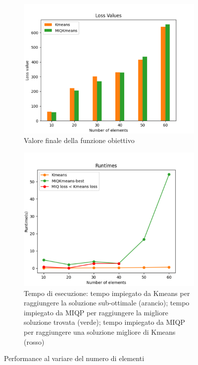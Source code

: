 \documentclass{article}
\begin{document}
    \begin{figure}[H]
     \centering
     \begin{subfigure}[t]{0.49\linewidth}
         \centering
         \includegraphics[width=\linewidth]{../results/plots/loss_size_heart}
         \caption{Valore finale della funzione obiettivo}
     \end{subfigure}
     \hfill
     \begin{subfigure}[t]{0.48\linewidth}
         \centering
         \includegraphics[width=\linewidth]{../results/plots/runtime_size_heart}
         \caption{Tempo di esecuzione: tempo impiegato da Kmeans per raggiungere la soluzione sub-ottimale (arancio); tempo impiegato da MIQP per raggiungere la migliore soluzione trovata (verde); tempo impiegato da MIQP per raggiungere una soluzione migliore di Kmeans (rosso)}
     \end{subfigure}
        \caption{Performance al variare del numero di elementi}
        \label{fig:size_real}
     \end{figure}
\end{document}
